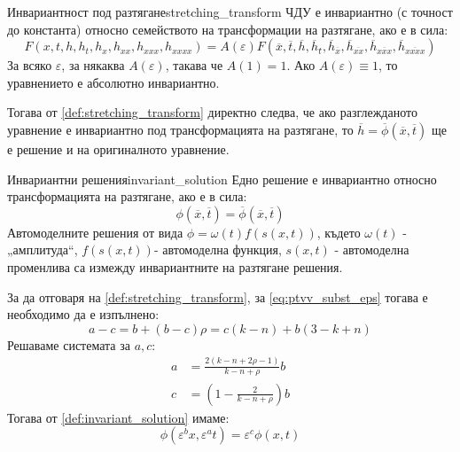 \begin{definition}{Инвариантност под разтягане}{stretching_transform}
    ЧДУ е инвариантно (с точност до константа) относно семейството на трансформации на разтягане, ако е в сила:
    \begin{equation*}
        \label{eq:stretching_transform}
        F(x,t,h,{h_t},{h_x},{h_{xx}},{h_{xxx}},{h_{xxxx}}) = A(\varepsilon )F(\overline x ,\overline t ,\overline h ,\overline h \overline {_t} ,{\overline h _{\overline x }},{\overline h _{\overline {xx} }},{\overline h _{\overline {xxx} }},{\overline h _{\overline {xxxx} }})
    \end{equation*}
    За всяко  $\varepsilon$, за някаква $A(\varepsilon)$, такава че $A(1) = 1$. Ако $A(\varepsilon) \equiv 1$, то уравнението е абсолютно инвариантно.
\end{definition}
Тогава от \autoref{def:stretching_transform} директно следва, че ако разглежданото уравнение е инвариантно под трансформацията на разтягане, то $\overline{h} = \overline{\phi}(\overline{x}, \overline{t})$ ще е решение и на оригиналното уравнение.
\begin{definition}{Инвариантни решения}{invariant_solution}
    Едно решение е инвариантно относно трансформацията на разтягане, ако е в сила:
    \begin{equation*}
        \label{eq:invariant_equation}
        \phi (\overline x ,\overline t ) = \overline \phi  (\overline x ,\overline t )
    \end{equation*}
    Автомоделните решения от вида $\phi  = \omega (t)f(s(x,t))$, където $\omega(t)$ - „амплитуда“,  $f(s(x,t))$- автомоделна функция,  $s(x,t)$ - автомоделна променлива са измежду инвариантните на разтягане решения.
\end{definition}
\noindent За да отговаря на \autoref{def:stretching_transform}, за \autoref{eq:ptvv_subst_eps} тогава е необходимо да е изпълнено:
\begin{equation*}
    a - c = b + (b - c)\rho  = c(k - n) + b(3 - k + n)
\end{equation*}
Решаваме системата за $a, c$:
\begin{align*}
    a &= \frac{{2\left( {k - n + 2\rho  - 1} \right)}}{{k - n + \rho }}b \\
    c &= \left( {1 - \frac{2}{{k - n + \rho }}} \right)b
\end{align*}
Тогава от \autoref{def:invariant_solution} имаме:
\begin{equation*}
    \phi ({\varepsilon ^b}x,{\varepsilon ^a}t) = {\varepsilon ^c}\phi (x,t)
\end{equation*}
